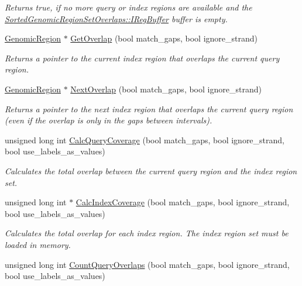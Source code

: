 \begin{DoxyCompactItemize}
\begin{DoxyCompactList}\small\item\em Returns true, if no more query or index regions are available and the \hyperlink{classSortedGenomicRegionSetOverlaps_a19fa18e6abd9f045786698fff48a445f}{SortedGenomicRegionSetOverlaps::IRegBuffer} buffer is empty. \end{DoxyCompactList}\item 
\hyperlink{classGenomicRegion}{GenomicRegion} $\ast$ \hyperlink{classGenomicRegionSetOverlaps_a46c3193d39eb61430b0267ca301b226e}{GetOverlap} (bool match\_\-gaps, bool ignore\_\-strand)
\begin{DoxyCompactList}\small\item\em Returns a pointer to the current index region that overlaps the current query region. \end{DoxyCompactList}\item 
\hyperlink{classGenomicRegion}{GenomicRegion} $\ast$ \hyperlink{classGenomicRegionSetOverlaps_a2fa112eab38f07e7bc75ac76f5b9fc67}{NextOverlap} (bool match\_\-gaps, bool ignore\_\-strand)
\begin{DoxyCompactList}\small\item\em Returns a pointer to the next index region that overlaps the current query region (even if the overlap is only in the gaps between intervals). \end{DoxyCompactList}\item 
unsigned long int \hyperlink{classGenomicRegionSetOverlaps_a1e30ae0e49423a432b7a1d3e3ff09011}{CalcQueryCoverage} (bool match\_\-gaps, bool ignore\_\-strand, bool use\_\-labels\_\-as\_\-values)
\begin{DoxyCompactList}\small\item\em Calculates the total overlap between the current query region and the index region set. \end{DoxyCompactList}\item 
unsigned long int $\ast$ \hyperlink{classGenomicRegionSetOverlaps_a5c31081b154c624ba35487d988082ffa}{CalcIndexCoverage} (bool match\_\-gaps, bool ignore\_\-strand, bool use\_\-labels\_\-as\_\-values)
\begin{DoxyCompactList}\small\item\em Calculates the total overlap for each index region. The index region set must be loaded in memory. \end{DoxyCompactList}\item 
unsigned long int \hyperlink{classGenomicRegionSetOverlaps_a012372e8ca88ef24bead47db23ab8ee4}{CountQueryOverlaps} (bool match\_\-gaps, bool ignore\_\-strand, bool use\_\-labels\_\-as\_\-values)

\end{DoxyCompactItemize}
